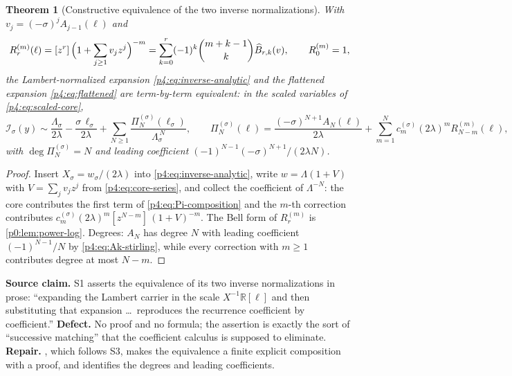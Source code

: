 \documentclass[11pt,a4paper,oneside]{book}
\theoremstyle{plain}
\newtheorem{theorem}{Theorem}[chapter]
\theoremstyle{definition}
\theoremstyle{remark}
\newcommand{\Real}{\mathbb{R}}
\newcommand{\Coef}[1]{[#1]\,}
\newcommand{\OB}{\widehat{B}}
\newcommand{\Xcore}{X}
\begin{document}
\begin{theorem}[Constructive equivalence of the two inverse normalizations]
\label{p4:thm:equivalence}
With $v_j=(-\sigma)^{j}A_{j-1}(\ell)$ and
\begin{equation}
  R^{(m)}_r(\ell)=\Coef{z^{r}}\Bigl(1+\sum_{j\ge1}v_jz^{j}\Bigr)^{-m}
  =\sum_{k=0}^{r}(-1)^{k}\binom{m+k-1}{k}\OB_{r,k}(v),
  \qquad R^{(m)}_0=1,
  \label{p4:eq:R-composition}
\end{equation}
the Lambert-normalized expansion \cref{p4:eq:inverse-analytic} and the
flattened expansion \cref{p4:eq:flattened} are term-by-term equivalent: in the
scaled variables of \cref{p4:eq:scaled-core},
\begin{equation}
  \mathcal I_\sigma(y)\sim\frac{\Lambda_\sigma}{2\lambda}
   -\frac{\sigma\,\ell_\sigma}{2\lambda}
   +\sum_{N\ge1}\frac{\Pi^{(\sigma)}_N(\ell_\sigma)}{\Lambda_\sigma^{\,N}},
  \qquad
  \Pi^{(\sigma)}_N(\ell)=\frac{(-\sigma)^{N+1}A_N(\ell)}{2\lambda}
   +\sum_{m=1}^{N}c^{(\sigma)}_m(2\lambda)^{m}R^{(m)}_{N-m}(\ell),
  \label{p4:eq:Pi-composition}
\end{equation}
with $\deg\Pi^{(\sigma)}_N=N$ and leading coefficient
$(-1)^{N-1}(-\sigma)^{N+1}/(2\lambda N)$.
\end{theorem}

\begin{proof}
Insert $\Xcore_\sigma=w_\sigma/(2\lambda)$ into
\cref{p4:eq:inverse-analytic}, write $w=\Lambda(1+V)$ with
$V=\sum_jv_jz^{j}$ from \cref{p4:eq:core-series}, and collect the coefficient
of $\Lambda^{-N}$: the core contributes the first term of
\cref{p4:eq:Pi-composition} and the $m$-th correction contributes
$c^{(\sigma)}_m(2\lambda)^{m}\Coef{z^{N-m}}(1+V)^{-m}$.  The Bell form of
$R^{(m)}_r$ is \cref{p0:lem:power-log}.  Degrees: $A_N$ has degree $N$ with
leading coefficient $(-1)^{N-1}/N$ by \cref{p4:eq:Ak-stirling}, while every
correction with $m\ge1$ contributes degree at most $N-m$.
\end{proof}

\begin{repairbox}
\textbf{Source claim.}  \textsf{S1} asserts the equivalence of its two inverse
normalizations in prose: ``expanding the Lambert carrier in the scale
$X^{-1}\Real[\ell]$ and then substituting that expansion \ldots\ reproduces
the recurrence coefficient by coefficient.''  \textbf{Defect.}  No proof and
no formula; the assertion is exactly the sort of ``successive matching''
that the coefficient calculus is supposed to eliminate.  \textbf{Repair.}
, which follows \textsf{S3}, makes the equivalence a
finite explicit composition with a proof, and identifies the degrees and
leading coefficients.
\end{repairbox}
\end{document}
